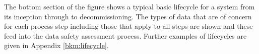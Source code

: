 The bottom section of the figure shows a typical basic lifecycle for a system from its inception through to decommissioning. The types of data that are of concern for each process step including those that apply to all steps are shown and these feed into the data safety assessment process. Further examples of lifecycles are given in Appendix \ref{bkm:lifecycle}.
\cbend

